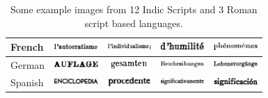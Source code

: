 \begin{table}[h]
\begin{tabular}{|l|c|c|c|c|}
French & \includegraphics[width=1.65cm,height=0.35cm]{figures/french_right_1.eps}  & \includegraphics[width=1.65cm,height=0.35cm]{figures/french_right_2.eps} &  \includegraphics[width=1.65cm,height=0.35cm]{figures/french_right_3.eps}  & \includegraphics[width=1.65cm,height=0.35cm]{figures/french_right_4.eps} \\ \hline
German &  \includegraphics[width=1.65cm,height=0.35cm]{figures/german_right_1.eps}  & \includegraphics[width=1.65cm,height=0.35cm]{figures/german_right_2.eps} &  \includegraphics[width=1.65cm,height=0.35cm]{figures/german_right_3.eps}  & \includegraphics[width=1.65cm,height=0.35cm]{figures/german_right_4.eps} \\ \hline
Spanish &  \includegraphics[width=1.65cm,height=0.35cm]{figures/spanish_right_1.eps}  & \includegraphics[width=1.65cm,height=0.35cm]{figures/spanish_right_2.eps} &  \includegraphics[width=1.65cm,height=0.35cm]{figures/spanish_right_3.eps}  & \includegraphics[width=1.65cm,height=0.35cm]{figures/spanish_right_4.eps} \\ \hline
\end{tabular}
\caption{Some example images from 12 Indic Scripts and 3 Roman script based languages.}
\label{fig:exImgs}
\end{table}

